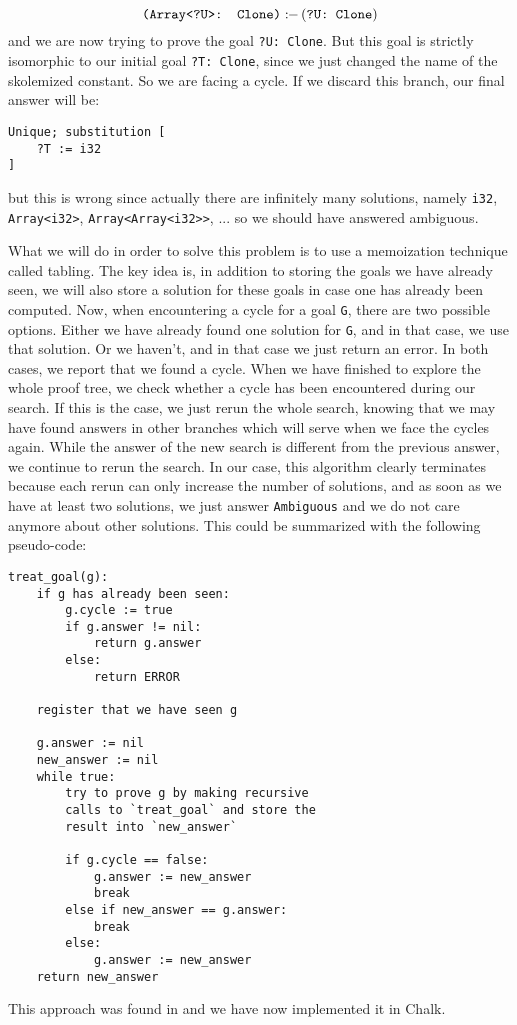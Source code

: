 \documentclass[twocolumn]{article}
\newcommand{\rust}[1]{\texttt{#1}}
\newcommand{\mrust}[1]{\text{\rust{#1}}}
\newcommand{\pif}[0]{:\!\!-\,}
\begin{document}
\[
\mrust{(Array<?U>: Clone)} \pif (\mrust{?U: Clone})
\]
and we are now trying to prove the goal \rust{?U: Clone}. But this goal is strictly isomorphic to our initial goal \rust{?T: Clone}, since we just changed the name of the skolemized constant. So we are facing a cycle. If we discard this branch, our final answer will be:
\begin{verbatim}
Unique; substitution [
    ?T := i32
]
\end{verbatim}
but this is wrong since actually there are infinitely many solutions, namely \rust{i32}, \rust{Array<i32>}, \rust{Array<Array<i32>>}, ... so we should have answered ambiguous.

What we will do in order to solve this problem is to use a memoization technique called tabling. The key idea is, in addition to storing the goals we have already seen, we will also store a solution for these goals in case one has already been computed. Now, when encountering a cycle for a goal \rust{G}, there are two possible options. Either we have already found one solution for \rust{G}, and in that case, we use that solution. Or we haven't, and in that case we just return an error. In both cases, we report that we found a cycle. When we have finished to explore the whole proof tree, we check whether a cycle has been encountered during our search. If this is the case, we just rerun the whole search, knowing that we may have found answers in other branches which will serve when we face the cycles again. While the answer of the new search is different from the previous answer, we continue to rerun the search. In our case, this algorithm clearly terminates because each rerun can only increase the number of solutions, and as soon as we have at least two solutions, we just answer \texttt{Ambiguous} and we do not care anymore about other solutions. This could be summarized with the following pseudo-code:
\begin{verbatim}
treat_goal(g):
    if g has already been seen:
        g.cycle := true
        if g.answer != nil:
            return g.answer
        else:
            return ERROR
    
    register that we have seen g
    
    g.answer := nil
    new_answer := nil
    while true:
        try to prove g by making recursive
        calls to `treat_goal` and store the
        result into `new_answer`
        
        if g.cycle == false:
            g.answer := new_answer
            break
        else if new_answer == g.answer:
            break
        else:
            g.answer := new_answer
    return new_answer
\end{verbatim}
This approach was found in \cite{cycles} and we have now implemented it in Chalk.
\end{document}
